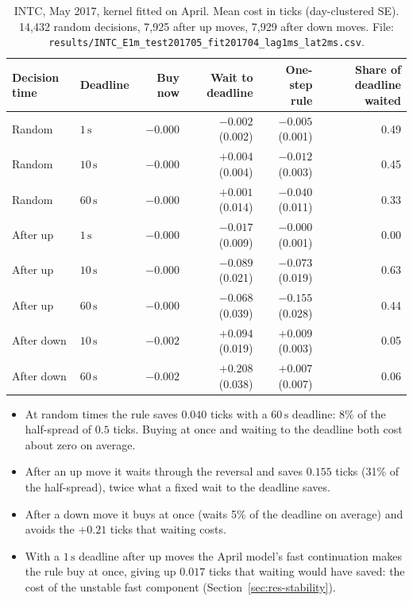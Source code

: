 \documentclass[11pt]{article}
\theoremstyle{definition}
\theoremstyle{remark}
\newcommand{\sx}{\,\text{s}}
\newcommand{\file}[1]{\texttt{#1}}
\begin{document}
\begin{table}[ht]
\centering
\small
\begin{tabular}{@{}llrrrr@{}}
\toprule
Decision time & Deadline & Buy now & Wait to deadline & One-step rule & Share of deadline waited \\
\midrule
Random & $1\sx$ & $-0.000$ & $-0.002$ (0.002) & $\mathbf{-0.005}$ (0.001) & 0.49 \\
Random & $10\sx$ & $-0.000$ & $+0.004$ (0.004) & $\mathbf{-0.012}$ (0.003) & 0.45 \\
Random & $60\sx$ & $-0.000$ & $+0.001$ (0.014) & $\mathbf{-0.040}$ (0.011) & 0.33 \\
After up & $1\sx$ & $-0.000$ & $-0.017$ (0.009) & $-0.000$ (0.001) & 0.00 \\
After up & $10\sx$ & $-0.000$ & $-0.089$ (0.021) & $\mathbf{-0.073}$ (0.019) & 0.63 \\
After up & $60\sx$ & $-0.000$ & $-0.068$ (0.039) & $\mathbf{-0.155}$ (0.028) & 0.44 \\
After down & $10\sx$ & $-0.002$ & $+0.094$ (0.019) & $+0.009$ (0.003) & 0.05 \\
After down & $60\sx$ & $-0.002$ & $+0.208$ (0.038) & $+0.007$ (0.007) & 0.06 \\
\bottomrule
\end{tabular}
\caption{INTC, May 2017, kernel fitted on April. Mean cost in ticks (day-clustered SE). 14,432 random decisions, 7,925 after up moves, 7,929 after down moves. File: \file{results/INTC\_E1m\_test201705\_fit201704\_lag1ms\_lat2ms.csv}.}
\label{tab:oos}
\end{table}

\begin{itemize}
\item At random times the rule saves $0.040$ ticks with a $60\sx$ deadline: 8\% of the half-spread of $0.5$ ticks. Buying at once and waiting to the deadline both cost about zero on average.
\item After an up move it waits through the reversal and saves $0.155$ ticks (31\% of the half-spread), twice what a fixed wait to the deadline saves.
\item After a down move it buys at once (waits 5\% of the deadline on average) and avoids the $+0.21$ ticks that waiting costs.
\item With a $1\sx$ deadline after up moves the April model's fast continuation makes the rule buy at once, giving up $0.017$ ticks that waiting would have saved: the cost of the unstable fast component (Section~\ref{sec:res-stability}).
\end{itemize}
\end{document}
